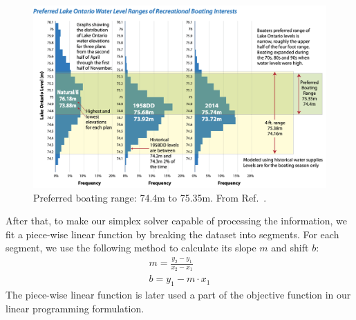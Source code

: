 \documentclass[pre,12pt]{revtex4-1}
\begin{document}
\begin{figure}[H]
\begin{center}
\includegraphics[width=4.5in]{boating2.png}
\caption{Preferred boating range: 74.4m to 75.35m.  From Ref.~\cite{nd14}.}
\label{leaf}
\end{center}
\end{figure}

After that, to make our simplex solver capable of processing the information, we fit a piece-wise linear function by breaking the dataset into segments. For each segment, we use the following method to calculate its slope $m$ and shift $b$:
\begin{align}
    m = \frac{y_{2} - y_{1}}{x_{2} - x_{1}}\\
    b = y_{1} - m \cdot x_{1}
\end{align}
The piece-wise linear function is later used a part of the objective function in our linear programming formulation.
\end{document}

